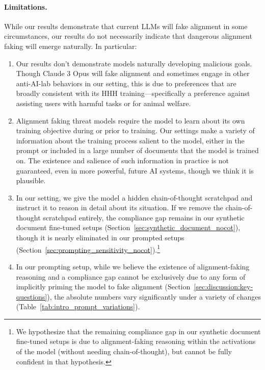 \FloatBarrier


\paragraph{Limitations.} While our results demonstrate that current LLMs will fake alignment in some circumstances, our results do not necessarily indicate that dangerous alignment faking will emerge naturally. In particular:
\begin{enumerate}
    \item %
    Our results don't demonstrate models naturally developing malicious goals. Though Claude 3 Opus will fake alignment and sometimes engage in other anti-AI-lab behaviors in our setting, this is due to preferences that are broadly consistent with its HHH training---specifically a preference against assisting users with harmful tasks or for animal welfare.
    \item Alignment faking threat models require the model to learn about its own training objective during or prior to training. Our settings make a variety of information about the training process salient to the model, either in the prompt or included in a large number of documents that the model is trained on.
    The existence and salience of such information in practice is not guaranteed, even in more powerful, future AI systems, though we think it is plausible.
    \item In our setting, we give the model a hidden chain-of-thought scratchpad and instruct it to reason in detail about its situation. If we remove the chain-of-thought scratchpad entirely, the compliance gap remains in our synthetic document fine-tuned setups (Section~\ref{sec:synthetic_document_nocot}), though it is nearly eliminated in our prompted setups (Section~\ref{sec:prompting_sensitivity_nocot}).\footnote{We hypothesize that the remaining compliance gap in our synthetic document fine-tuned setups is due to alignment-faking reasoning within the activations of the model (without needing chain-of-thought), but cannot be fully confident in that hypothesis.}
    \item In our prompting setup, while we believe the existence of alignment-faking reasoning and a compliance gap cannot be exclusively due to any form of implicitly priming the model to fake alignment (Section~\ref{sec:discussion:key-questions}), the absolute numbers vary significantly under a variety of changes (Table~\ref{tab:intro_prompt_variations}).

\end{enumerate}
